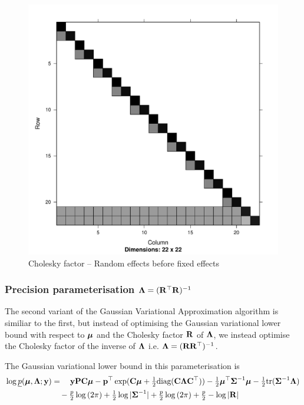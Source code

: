 \documentclass{amsart}[12pt]
\begin{document}
			\begin{figure}[p]
				\caption{\tiny Cholesky factor -- Random effects before fixed effects}
				\label{fig:cholrandomfixed}
				\includegraphics[scale=.25]{mZ_mX_cholesky.pdf}
			\end{figure}
				
			\subsubsection{Precision parameterisation ${\boldsymbol \Lambda} = ({\bf R}^\top {\bf R})^{-1}$}
					
			\noindent The second variant of the Gaussian Variational Approximation algorithm is similiar to the first, but
			instead of optimising the Gaussian variational lower bound with respect to ${\boldsymbol \mu}$ and the Cholesky factor
			${\bf R}$ of ${\boldsymbol \Lambda}$, we instead optimise the Cholesky factor of the inverse of ${\boldsymbol \Lambda}$ i.e. ${\boldsymbol \Lambda} =
			({\bf R} {\bf R}^\top)^{-1}$.
			
			The Gaussian variational lower bound in this parameterisation is
			\begin{align*}
				\log \underline{p}({\boldsymbol \mu}, {\boldsymbol \Lambda}; {\bf y}) & = \quad {\bf y}{\bf P}{\bf C} {\boldsymbol\mu} - {\bf p}^\top \exp({\bf C} {\boldsymbol \mu} + \tfrac{1}{2} \text{diag}({\bf C} {\boldsymbol \Lambda} {\bf C}^\top)) - \tfrac{1}{2} {\boldsymbol \mu}^\top {\boldsymbol\Sigma}^{-1} {\boldsymbol \mu} - \tfrac{1}{2} \text{tr}{({\boldsymbol\Sigma}^{-1} {\boldsymbol\Lambda})} \\
				                                        & \quad- \tfrac{p}{2} \log{(2 \pi)} + \tfrac{1}{2} \log{|{\boldsymbol\Sigma}^{-1}|} + \tfrac{p}{2} \log{(2 \pi)} + \tfrac{p}{2} - \log{|{\bf R}|}                                             
			\end{align*}
					
\end{document}

